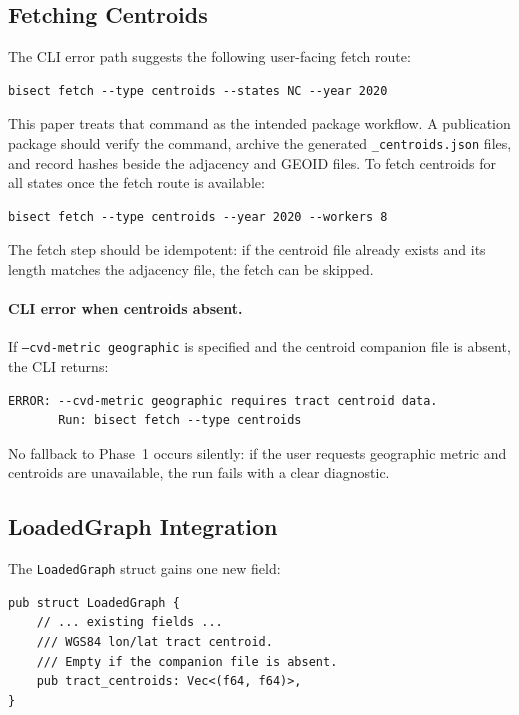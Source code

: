 \subsection{Fetching Centroids}
\label{subsec:fetch}

The CLI error path suggests the following user-facing fetch route:

\begin{verbatim}
bisect fetch --type centroids --states NC --year 2020
\end{verbatim}

This paper treats that command as the intended package workflow. A publication
package should verify the command, archive the generated
\texttt{\_centroids.json} files, and record hashes beside the adjacency and
GEOID files. To fetch centroids for all states once the fetch route is
available:

\begin{verbatim}
bisect fetch --type centroids --year 2020 --workers 8
\end{verbatim}

The fetch step should be idempotent: if the centroid file already exists and
its length matches the adjacency file, the fetch can be skipped.

\paragraph{CLI error when centroids absent.}
If \texttt{--cvd-metric geographic} is specified and the centroid companion
file is absent, the CLI returns:

\begin{verbatim}
ERROR: --cvd-metric geographic requires tract centroid data.
       Run: bisect fetch --type centroids
\end{verbatim}

No fallback to Phase~1 occurs silently: if the user requests geographic
metric and centroids are unavailable, the run fails with a clear diagnostic.

\subsection{LoadedGraph Integration}

The \texttt{LoadedGraph} struct gains one new field:

\begin{verbatim}
pub struct LoadedGraph {
    // ... existing fields ...
    /// WGS84 lon/lat tract centroid.
    /// Empty if the companion file is absent.
    pub tract_centroids: Vec<(f64, f64)>,
}
\end{verbatim}

